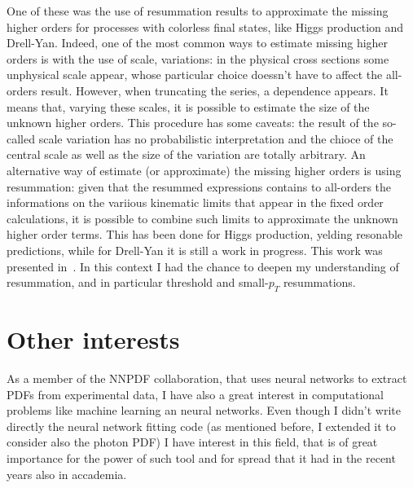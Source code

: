 \documentclass[11pt,a4paper]{moderncv}        %
\begin{document}
One of these was the use of resummation results to approximate the missing higher orders for processes with colorless final states,
like Higgs production and Drell-Yan.
Indeed, one of the most common ways to estimate missing higher orders is with the use of scale, variations:
in the physical cross sections some unphysical scale appear, whose particular choice doessn't have to affect the all-orders result.
However, when truncating the series, a dependence appears.
It means that, varying these scales, it is possible to estimate the size of the unknown higher orders.
This procedure has some caveats: the result of the so-called scale variation has no probabilistic interpretation and the chioce of
the central scale as well as the size of the variation are totally arbitrary.
An alternative way of estimate (or approximate) the missing higher orders is using resummation: given that the resummed expressions
contains to all-orders the informations on the variious kinematic limits that appear in the fixed order calculations, it is possible
to combine such limits to approximate the unknown higher order terms.
This has been done for Higgs production, yelding resonable predictions, while for Drell-Yan it is still a work in progress.
This work was presented in~\cite{laurenti2022approximating}.
In this context I had the chance to deepen my understanding of resummation, and in particular threshold and small-$p_T$ resummations.

\section{Other interests}

As a member of the NNPDF collaboration, that uses neural networks to extract PDFs from experimental data, I have also a great interest
in computational problems like machine learning an neural networks.
Even though I didn't write directly the neural network fitting code (as mentioned before, I extended it to consider also the photon PDF)
I have interest in this field, that is of great importance for the power of such tool and for spread that it had in the recent years
also in accademia.



\end{document}
